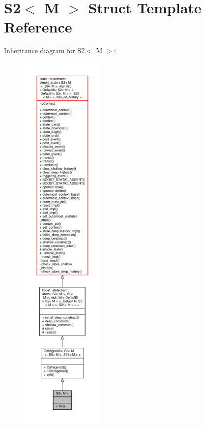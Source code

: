 \hypertarget{struct_s2}{}\section{S2$<$ M $>$ Struct Template Reference}
\label{struct_s2}


Inheritance diagram for S2$<$ M $>$\+:
\nopagebreak
\begin{figure}[H]
\begin{center}
\leavevmode
\includegraphics[height=550pt]{struct_s2__inherit__graph}
\end{center}
\end{figure}


